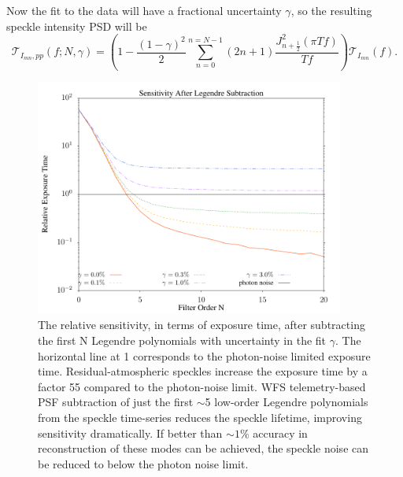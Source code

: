 \documentclass[11pt,preprint]{aastex}
\begin{document}

Now the fit to the data will have a fractional uncertainty $\gamma$, so the resulting speckle intensity PSD will be
\begin{equation}
\mathcal{T}_{I_{mn},pp}(f;N,\gamma) = \left( 1 -  \frac{(1-\gamma)^2}{2}\sum_{n=0}^{n=N-1}  (2n+1) \frac{J_{n+\frac{1}{2}}^2(\pi T f)}{T f}\right) \mathcal{T}_{I_{mn}}(f).
\end{equation}

\begin{figure}
\centering
\includegraphics[width=4in]{relsens.pdf}
\caption{The relative sensitivity, in terms of exposure time, after subtracting the first N Legendre polynomials with uncertainty in the fit $\gamma$.  The horizontal line at 1 corresponds to the photon-noise limited exposure time.  Residual-atmospheric speckles increase the exposure time by a factor 55 compared to the photon-noise limit.   
WFS telemetry-based PSF subtraction of just the first $\sim$5 low-order Legendre polynomials from the speckle time-series reduces the speckle lifetime, improving sensitivity dramatically. If better than $\sim$$1\%$ accuracy in reconstruction of these modes can be achieved, the speckle noise can be reduced to below the photon noise limit. \label{fig:legrelsens}}
\end{figure}
\end{document}
